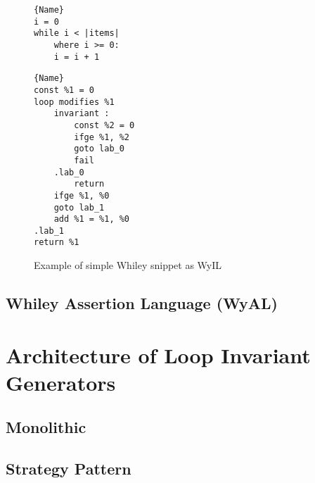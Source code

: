 \begin{figure}
\noindent\begin{minipage}{.45\textwidth}
\begin{lstlisting}[caption={Whiley Code},frame=tlrb,numbers=none]{Name}
i = 0
while i < |items|
    where i >= 0:
    i = i + 1
\end{lstlisting}
\end{minipage}\hfill
\begin{minipage}{.45\textwidth}
\begin{lstlisting}[caption={WyIL Code},frame=tlrb,numbers=none]{Name}
const %1 = 0
loop modifies %1
    invariant :
        const %2 = 0
        ifge %1, %2
        goto lab_0
        fail
    .lab_0
        return
    ifge %1, %0
    goto lab_1
    add %1 = %1, %0
.lab_1
return %1
\end{lstlisting}
\end{minipage}
    \label{lst:design-wyil}
    \caption{Example of simple Whiley snippet as WyIL}
\end{figure}

\subsection{Whiley Assertion Language (WyAL)}





\section{Architecture of Loop Invariant Generators}

\subsection{Monolithic}

\subsection{Strategy Pattern}
